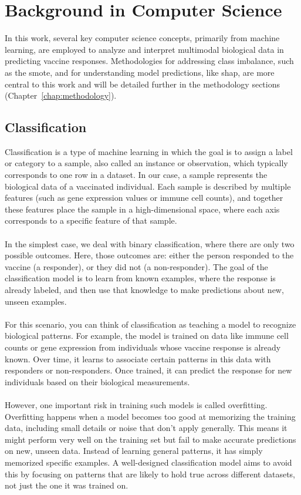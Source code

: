\documentclass[12pt,a4paper]{report}
\begin{document}
\pagebreak
\section{Background in Computer Science}
\noindent
In this work, several key computer science concepts, primarily from machine learning, are employed to analyze and interpret multimodal biological data in predicting vaccine responses. Methodologies for addressing class imbalance, such as the \acrfull{smote}, and for understanding model predictions, like \acrfull{shap}, are more central to this work and will be detailed further in the methodology sections (Chapter~\ref{chap:methodology}).

\subsection{Classification}
Classification is a type of machine learning in which the goal is to assign a label or category to a sample, also called an instance or observation, which typically corresponds to one row in a dataset. In our case, a sample represents the biological data of a vaccinated individual. Each sample is described by multiple features (such as gene expression values or immune cell counts), and together these features place the sample in a high-dimensional space, where each axis corresponds to a specific feature of that sample.\\
\\
In the simplest case, we deal with binary classification, where there are only two possible outcomes. Here, those outcomes are: either the person responded to the vaccine (a responder), or they did not (a non-responder). The goal of the classification model is to learn from known examples, where the response is already labeled, and then use that knowledge to make predictions about new, unseen examples.\\
\\
For this scenario, you can think of classification as teaching a model to recognize biological patterns. For example, the model is trained on data like immune cell counts or gene expression from individuals whose vaccine response is already known. Over time, it learns to associate certain patterns in this data with responders or non-responders. Once trained, it can predict the response for new individuals based on their biological measurements.\\
\\
However, one important risk in training such models is called overfitting. Overfitting happens when a model becomes too good at memorizing the training data, including small details or noise that don’t apply generally. This means it might perform very well on the training set but fail to make accurate predictions on new, unseen data. Instead of learning general patterns, it has simply memorized specific examples. A well-designed classification model aims to avoid this by focusing on patterns that are likely to hold true across different datasets, not just the one it was trained on.
\end{document}
